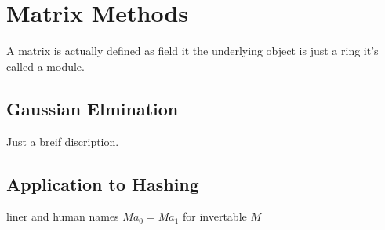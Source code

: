 
\chapter{Matrix Methods}
A matrix is actually defined as field
it the underlying object is just a ring it's called a module.
\section{Gaussian Elmination}
Just a breif discription.

\section{Application to Hashing}
liner and human names
$Ma_0 = Ma_1$ for invertable $M$
